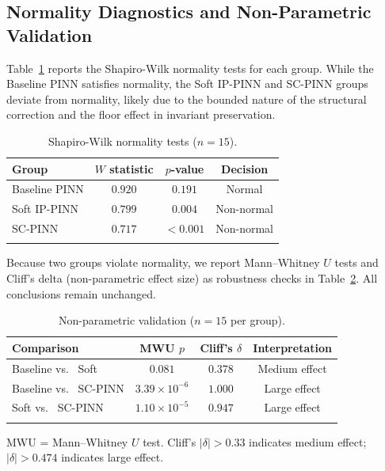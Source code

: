 \documentclass[pdflatex,sn-mathphys-num]{sn-jnl}
\theoremstyle{thmstyleone}%
\theoremstyle{thmstyletwo}%
\theoremstyle{thmstylethree}%
\providecommand{\vs}{vs.\ }
\begin{document}
\begin{appendices}
		\section{Normality Diagnostics and Non-Parametric Validation}\label{secB1}
		
		Table~\ref{tab:shapiro} reports the Shapiro-Wilk normality tests for each group. While the Baseline PINN satisfies normality, the Soft IP-PINN and SC-PINN groups deviate from normality, likely due to the bounded nature of the structural correction and the floor effect in invariant preservation.
		
		\begin{table}[h]
			\centering
			\caption{Shapiro-Wilk normality tests ($n=15$).}
			\label{tab:shapiro}
			\begin{tabular}{@{}lccc@{}}
				\toprule
				\textbf{Group} & \textbf{$W$ statistic} & \textbf{$p$-value} & \textbf{Decision} \\
				\midrule
				Baseline PINN & $0.920$ & $0.191$ & Normal \\
				Soft IP-PINN & $0.799$ & $0.004$ & Non-normal \\
				SC-PINN & $0.717$ & $<0.001$ & Non-normal \\
				\botrule
			\end{tabular}
		\end{table}
		
		Because two groups violate normality, we report Mann--Whitney $U$ tests and Cliff's delta (non-parametric effect size) as robustness checks in Table~\ref{tab:nonparametric}. All conclusions remain unchanged.
		
		\begin{table}[h]
			\centering
			\caption{Non-parametric validation ($n=15$ per group).}
			\label{tab:nonparametric}
			\begin{tabular}{@{}lccc@{}}
				\toprule
				\textbf{Comparison} & \textbf{MWU $p$} & \textbf{Cliff's $\delta$} & \textbf{Interpretation} \\
				\midrule
				Baseline \vs{} Soft & $0.081$ & $0.378$ & Medium effect \\
				Baseline \vs{} SC-PINN & $3.39\times10^{-6}$ & $1.000$ & Large effect \\
				Soft \vs{} SC-PINN & $1.10\times10^{-5}$ & $0.947$ & Large effect \\
				\botrule
			\end{tabular}
			\vspace{3pt}
			\footnotesize{MWU = Mann--Whitney $U$ test. Cliff's $|\delta| > 0.33$ indicates medium effect; $|\delta| > 0.474$ indicates large effect.}
		\end{table}
		

\end{appendices}
\end{document}
